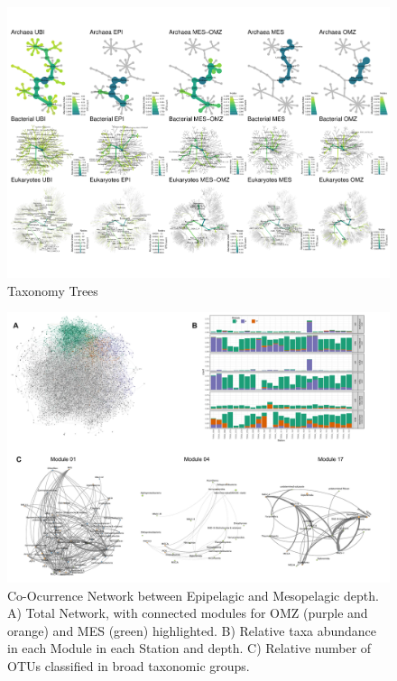 \documentclass[fleqn,10pt]{wlscirep}
\begin{document}
\clearpage
\begin{figure}[ht]
    \centering
    \includegraphics[scale=0.7,angle=90,origin=c]{images/hmap_general_pub.pdf}
    \caption{Taxonomy Trees}
    \label{fig:tax_trees}
\end{figure}
\clearpage
\begin{figure}[ht]
    \centering
    \includegraphics[scale=0.5]{images/Networks_Composite_v2.pdf}
    \caption{Co-Ocurrence Network between Epipelagic and Mesopelagic depth. A) Total Network, with connected modules for OMZ (purple and orange) and MES (green) highlighted. B) Relative taxa abundance in each Module in each Station and depth. C) Relative number of OTUs classified in broad taxonomic groups.}
    \label{fig:networks}
\end{figure}
\clearpage
\end{document}
